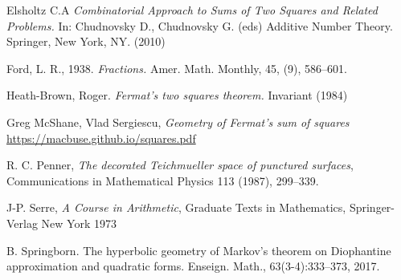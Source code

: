 \documentclass[12pt]{amsart}
\theoremstyle{plain}
\theoremstyle{definition}
\begin{document}

Elsholtz C.A 
\textit{Combinatorial Approach to Sums of Two Squares and Related Problems.}
 In: Chudnovsky D., Chudnovsky G. (eds) Additive Number Theory. Springer, New York, NY.
 (2010) 


Ford, L. R., 1938. \textit{Fractions.} Amer. Math. Monthly, 45, (9), 586–601.



%



Heath-Brown, Roger. 
\textit{ Fermat’s two squares theorem.} Invariant (1984) 




Greg McShane, Vlad Sergiescu,
\textit{Geometry of Fermat's sum of squares}
\url{https://macbuse.github.io/squares.pdf}

R. C. Penner, 
\textit{The decorated Teichmueller space of punctured surfaces}, 
Communications in Mathematical Physics 113 (1987), 299–339.



J-P. Serre,
\textit{A Course in Arithmetic},
Graduate Texts in Mathematics,
Springer-Verlag New York
1973



B. Springborn. The hyperbolic geometry of Markov’s theorem on Diophantine
approximation and quadratic forms. Enseign. Math., 63(3-4):333–373, 2017.
\end{document}
